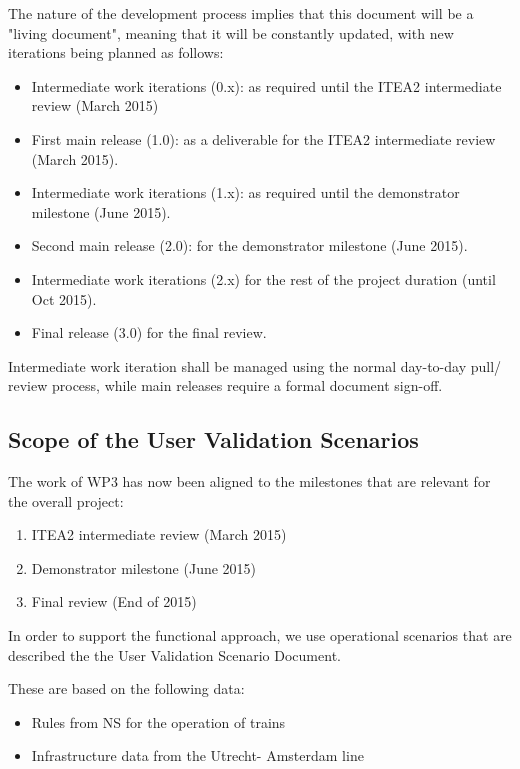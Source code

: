 The nature of the development process implies that this document will be a "living document", meaning that it will be constantly updated, with new iterations being planned as follows:

\begin{itemize}
\item Intermediate work iterations (0.x): as required until the ITEA2 intermediate review (March 2015)

\item First main release (1.0): as a deliverable for the ITEA2 intermediate review (March 2015).

\item Intermediate work iterations (1.x): as required until the demonstrator milestone (June 2015).

\item Second main release (2.0): for the demonstrator milestone (June 2015).

\item Intermediate work iterations (2.x) for the rest of the project duration (until Oct 2015).

\item Final release (3.0) for the final review.
\end{itemize}

Intermediate work iteration shall be managed using the normal day-to-day pull/ review process, while main releases require a formal document sign-off.



\subsection{Scope of the User Validation Scenarios}

The work of WP3 has now been aligned to the milestones that are relevant for the overall project:
\begin{enumerate}
\item ITEA2 intermediate review (March 2015)
\item Demonstrator milestone (June 2015)
\item Final review (End of 2015)
\end{enumerate}

In order to support the functional approach, we use operational scenarios that are described the the User Validation Scenario Document.

These are based on the following data:
\begin{itemize}
\item Rules from NS for the operation of trains
\item Infrastructure data from the Utrecht- Amsterdam line
\end{itemize}


